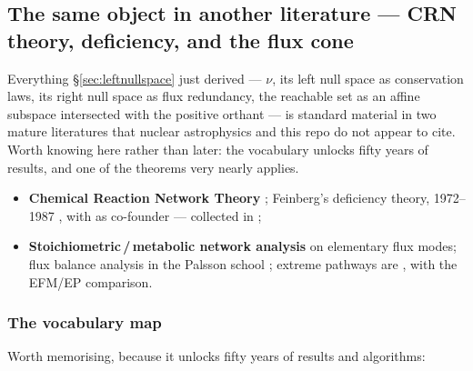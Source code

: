\subsection{The same object in another literature --- CRN theory, deficiency,
            and the flux cone}
\label{sec:crn}

Everything \S\ref{sec:leftnullspace} just derived --- $\nu$, its left null space
as conservation laws, its right null space as flux redundancy, the reachable set
as an affine subspace intersected with the positive orthant --- is standard
material in two mature literatures that nuclear astrophysics and this repo do
not appear to cite. Worth knowing here rather than later: the vocabulary unlocks
fifty years of results, and one of the theorems very nearly applies.

\begin{itemize}
\item \textbf{Chemical Reaction Network Theory} \citep{hornjackson1972};
  Feinberg's deficiency theory, 1972--1987 \citep{feinberg1972, feinberg1987},
  with \citet{horn1972} as co-founder --- collected in \citet{feinberg2019};
\item \textbf{Stoichiometric\,/\,metabolic network analysis}
  \citep{schuster1994} on elementary flux modes; flux balance analysis in the
  Palsson school \citep{varma1994, orth2010}; extreme pathways are
  \citet{schilling2000}, with \citet{klamt2003} the EFM/EP comparison.
\end{itemize}

\subsubsection{The vocabulary map}
\label{sec:crnvocab}

Worth memorising, because it unlocks fifty years of results and algorithms:

